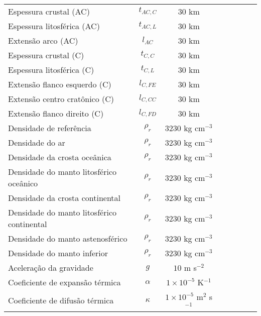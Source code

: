 \begin{center}
\begin{longtable}{lccccccc}
        Espessura crustal (AC) & $t_{AC,C}$ & $30$ km \\
        Espessura litosférica (AC) & $t_{AC,L}$ & $30$ km \\
        Extensão arco (AC) & $l_{AC}$ & $30$ km \\

        Espessura crustal (C) & $t_{C,C}$ & $30$ km \\
        Espessura litosférica (C) & $t_{C,L}$ & $30$ km \\
        Extensão flanco esquerdo (C) & $l_{C,FE}$ & $30$ km \\
        Extensão centro cratônico (C) & $l_{C,CC}$ & $30$ km \\
        Extensão flanco direito (C) & $l_{C,FD}$ & $30$ km \\
        
        Densidade de referência & $\rho_r$ & $3230$ kg cm$^{-3}$ \\
        Densidade do ar & $\rho_r$ & $3230$ kg cm$^{-3}$ \\
        Densidade da crosta oceânica & $\rho_r$ & $3230$ kg cm$^{-3}$ \\
        Densidade do manto litosférico oceânico & $\rho_r$ & $3230$ kg cm$^{-3}$ \\
        Densidade da crosta continental & $\rho_r$ & $3230$ kg cm$^{-3}$ \\
        Densidade do manto litosférico continental & $\rho_r$ & $3230$ kg cm$^{-3}$ \\
        Densidade do manto astenosférico & $\rho_r$ & $3230$ kg cm$^{-3}$ \\
        Densidade do manto inferior & $\rho_r$ & $3230$ kg cm$^{-3}$ \\

        Aceleração da gravidade & $g$ & $10$ m s$^{-2}$ \\
        Coeficiente de expansão térmica & $\alpha$ & $1\times10^{-5}$ K$^{-1}$ \\
        Coeficiente de difusão térmica & $\kappa$ & $1\times10^{-5}$ m$^2$ s$^{-1}$ \\


\end{longtable}
\end{center}

